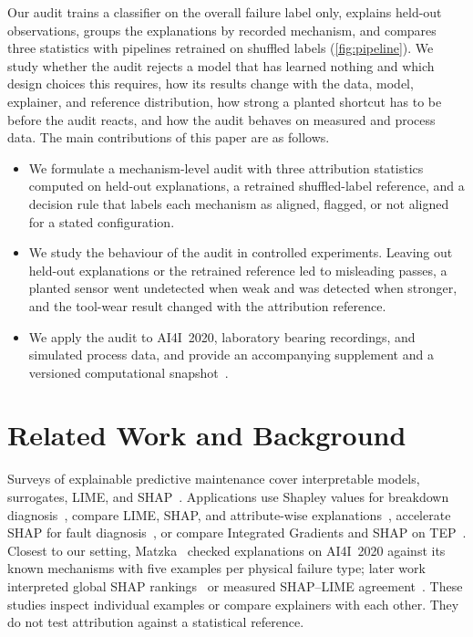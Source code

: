 \documentclass[conference]{IEEEtran}
\begin{document}
Our audit trains a classifier on the overall failure label only, explains held-out observations, groups the explanations by recorded mechanism, and compares three statistics with pipelines retrained on shuffled labels (\cref{fig:pipeline}). We study whether the audit rejects a model that has learned nothing and which design choices this requires, how its results change with the data, model, explainer, and reference distribution, how strong a planted shortcut has to be before the audit reacts, and how the audit behaves on measured and process data. The main contributions of this paper are as follows.
\begin{itemize}
    \item We formulate a mechanism-level audit with three attribution statistics computed on held-out explanations, a retrained shuffled-label reference, and a decision rule that labels each mechanism as aligned, flagged, or not aligned for a stated configuration.
    \item We study the behaviour of the audit in controlled experiments. Leaving out held-out explanations or the retrained reference led to misleading passes, a planted sensor went undetected when weak and was detected when stronger, and the tool-wear result changed with the attribution reference.
    \item We apply the audit to AI4I~2020, laboratory bearing recordings, and simulated process data, and provide an accompanying supplement and a versioned computational snapshot~\cite{artifact}.
\end{itemize}

\section{Related Work and Background}
\label{sec:related}

Surveys of explainable predictive maintenance cover interpretable models, surrogates, LIME, and SHAP~\cite{cummins2024survey,vollert2021interpretable}. Applications use Shapley values for breakdown diagnosis~\cite{steurtewagen2021adding}, compare LIME, SHAP, and attribute-wise explanations~\cite{jalali2020interpretability}, accelerate SHAP for fault diagnosis~\cite{chen2025shep}, or compare Integrated Gradients and SHAP on TEP~\cite{gravanis2026explainability}. Closest to our setting, Matzka~\cite{matzka2020explainable} checked explanations on AI4I~2020 against its known mechanisms with five examples per physical failure type; later work interpreted global SHAP rankings~\cite{milling2025shap} or measured SHAP--LIME agreement~\cite{obeten2026agreement}. These studies inspect individual examples or compare explainers with each other. They do not test attribution against a statistical reference.
\end{document}

